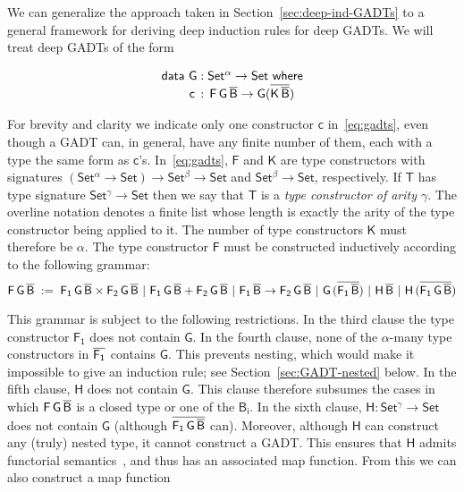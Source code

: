\documentclass[9pt]{entcs}
\begin{document}
We can generalize the approach taken in
Section~\ref{sec:deep-ind-GADTs} to a general framework for deriving
deep induction rules for deep GADTs. We will treat deep GADTs of the
form 

\vspace*{-0.05in}

\begin{equation}\label{eq:gadts}
\begin{array}{l}
  \mathsf{data\ G : Set^\alpha
    \to Set\ where}\\
\mathsf{\;\;\;\;\;\;\;\;c\, :\, F\,G\,\overline{B} \to G (\overline{K\,\overline{B}})}
\end{array}
\end{equation}

\noindent
For brevity and clarity we indicate only one constructor $\mathsf{c}$
in~\eqref{eq:gadts}, even though a GADT can, in general, have any
finite number of them, each with a type the same form as
$\mathsf{c}$'s. In~\eqref{eq:gadts}, $\mathsf{F}$ and $\mathsf{K}$ are
type constructors with signatures $\mathsf{(Set^{\alpha} \to Set) \to
  Set^{\beta} \to Set}$ and $\mathsf{Set^{\beta} \to Set}$,
respectively. If $\mathsf{T}$ has type signature $\mathsf{Set^{\gamma}
  \to Set}$ then we say that $\mathsf{T}$ is a {\em type constructor
  of arity $\mathsf{\gamma}$}.  The overline notation denotes a finite
list whose length is exactly the arity of the type constructor being
applied to it. The number of type constructors $\mathsf{K}$ must
therefore be $\alpha$. The type constructor $\mathsf{F}$ must be
constructed inductively according to the following grammar:
\[\mathsf{F\,G\,\overline{B}\; :=\;
F_1\,G\,\overline{B} \times F_2\,G\,\overline{B} \ \vert\ F_1\,G\,\overline{B} +
F_2\,G\,\overline{B} \ \vert\ F_1\,\overline{B} \to F_2\,G\,\overline{B}
\ \vert\ G\,(\overline{F_1\,\overline{B}}) \ \vert\ H\,\overline{B} \ \vert\ H\,
(\overline{F_1\,G\,\overline{B}}) }\]


\pagebreak

\noindent
This grammar is subject to the following restrictions. In the third
clause the type constructor $\mathsf{F_1}$ does not contain
$\mathsf{G}$. In the fourth clause, none of the $\mathsf{\alpha}$-many
type constructors in $\mathsf{\overline{F_1}}$ contains $\mathsf{G}$.  This
prevents nesting, which would make it impossible to give an induction
rule; see Section~\ref{sec:GADT-nested} below. In the fifth clause,
$\mathsf{H}$ does not contain $\mathsf{G}$. This clause therefore
subsumes the cases in which $\mathsf{F\,G\,\overline{B}}$ is a closed type
or one of the $\mathsf{B_i}$. In the sixth clause, $\mathsf{H :
  Set^\gamma \to Set}$ does not contain $\mathsf{G}$ (although
$\overline{\mathsf{F_1\,G\,\overline{B}}}$ can). Moreover, although $\mathsf{H}$
can construct any (truly) nested type, it cannot construct a
GADT. This ensures that $\mathsf{H}$ admits functorial
semantics~\cite{jp20}, and thus has an associated map function. From
this we can also construct a map function 
\end{document}
